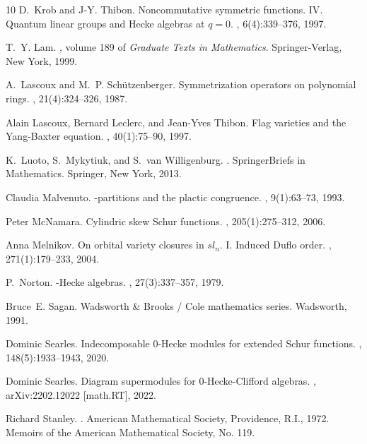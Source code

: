 \documentclass[12pt, reqno]{amsart}
\theoremstyle{definition}
\numberwithin{equation}{section} \numberwithin{figure}{section}
\numberwithin{table}{section}
\begin{document}
\begin{thebibliography}{10}
D.~Krob and J-Y. Thibon.
\newblock Noncommutative symmetric functions. {IV}. {Q}uantum linear groups and
  {H}ecke algebras at {$q=0$}.
, 6(4):339--376, 1997.

T.~Y. Lam.
, volume 189 of {\em Graduate
  Texts in Mathematics}.
\newblock Springer-Verlag, New York, 1999.

A.~Lascoux and M.~P. Schützenberger.
\newblock Symmetrization operators on polynomial rings.
, 21(4):324--326, 1987.

Alain Lascoux, Bernard Leclerc, and Jean-Yves Thibon.
\newblock Flag varieties and the {Y}ang-{B}axter equation.
, 40(1):75--90, 1997.

K.~Luoto, S.~Mykytiuk, and S.~van Willigenburg.
.
\newblock SpringerBriefs in Mathematics. Springer, New York, 2013.

Claudia Malvenuto.
-partitions and the plactic congruence.
, 9(1):63--73, 1993.

Peter McNamara.
\newblock Cylindric skew {S}chur functions.
, 205(1):275--312, 2006.

Anna Melnikov.
\newblock On orbital variety closures in {$sl_n$}. {I}. {I}nduced {D}uflo
  order.
, 271(1):179--233, 2004.

P.~Norton.
-{H}ecke algebras.
, 27(3):337--357, 1979.

Bruce~E. Sagan.
\newblock Wadsworth \& Brooks / Cole mathematics series. Wadsworth, 1991.

Dominic Searles.
\newblock Indecomposable {$0$}-{H}ecke modules for extended {S}chur functions.
, 148(5):1933--1943, 2020.

Dominic Searles.
\newblock Diagram supermodules for $0$-{H}ecke-{C}lifford algebras.
, arXiv:2202.12022 [math.RT], 2022.

Richard Stanley.
.
\newblock American Mathematical Society, Providence, R.I., 1972.
\newblock Memoirs of the American Mathematical Society, No. 119.


\end{thebibliography}
\end{document}

